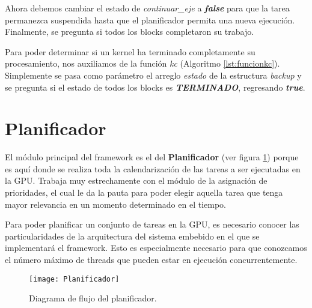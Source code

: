 Ahora debemos cambiar el estado de \textit{continuar\_eje} a \textbf{\textit{false}} para que la tarea permanezca suspendida hasta que el planificador permita una nueva ejecución. Finalmente, se pregunta si todos los blocks completaron su trabajo.



Para poder determinar si un kernel ha terminado completamente su procesamiento, nos auxiliamos de la función \textit{kc} (Algoritmo \ref{lst:funcionkc}). Simplemente se pasa como parámetro el arreglo \textit{estado} de la estructura \textit{backup} y se pregunta si el estado de todos los blocks es \textit{\textbf{TERMINADO}}, regresando \textbf{\textit{true}}.



\section{Planificador} \label{secc:planificador}

El módulo principal del framework es el del \textbf{Planificador} (ver figura \ref{fig:Planificador}) porque es aquí donde se realiza toda la calendarización de las tareas a ser ejecutadas en la GPU. Trabaja muy estrechamente con el módulo de la asignación de prioridades, el cual le da la pauta para poder elegir aquella tarea que tenga mayor relevancia en un momento determinado en el tiempo. 



Para poder planificar un conjunto de tareas en la GPU, es necesario conocer las particularidades de la arquitectura del sistema embebido en el que se implementará el framework. Esto es especialmente necesario para que conozcamos el número máximo de threads que pueden estar en ejecución concurrentemente.

    \begin{figure}[!]
      \centering
        \texttt{[image: Planificador]}
        \caption{Diagrama de flujo del planificador.}
        \label{fig:Planificador}
    \end{figure}

